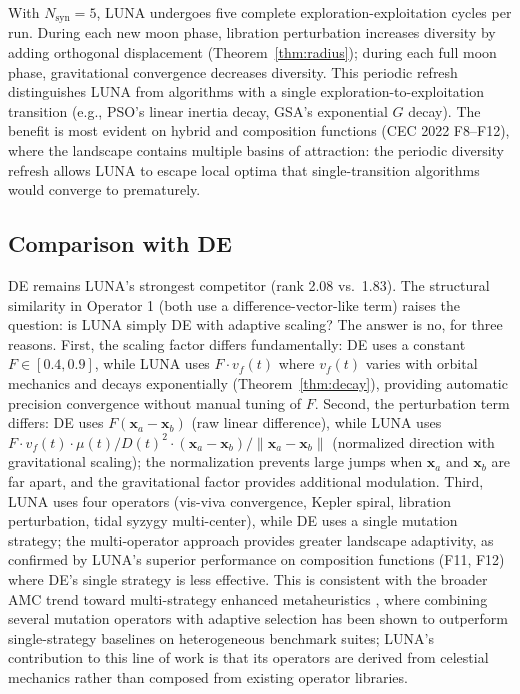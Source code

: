 \documentclass[review]{elsarticle}
\theoremstyle{definition}
\begin{document}
With $N_{\mathrm{syn}} = 5$, LUNA undergoes five complete exploration-exploitation cycles per run. During each new moon phase, libration perturbation increases diversity by adding orthogonal displacement (Theorem~\ref{thm:radius}); during each full moon phase, gravitational convergence decreases diversity. This periodic refresh distinguishes LUNA from algorithms with a single exploration-to-exploitation transition (e.g., PSO's linear inertia decay, GSA's exponential $G$ decay). The benefit is most evident on hybrid and composition functions (CEC 2022 F8--F12), where the landscape contains multiple basins of attraction: the periodic diversity refresh allows LUNA to escape local optima that single-transition algorithms would converge to prematurely.

\subsection{Comparison with DE}

DE remains LUNA's strongest competitor (rank 2.08 vs.\ 1.83). The structural similarity in Operator 1 (both use a difference-vector-like term) raises the question: is LUNA simply DE with adaptive scaling? The answer is no, for three reasons. First, the scaling factor differs fundamentally: DE uses a constant $F \in [0.4, 0.9]$, while LUNA uses $F \cdot v_f(t)$ where $v_f(t)$ varies with orbital mechanics and decays exponentially (Theorem~\ref{thm:decay}), providing automatic precision convergence without manual tuning of $F$. Second, the perturbation term differs: DE uses $F(\mathbf{x}_a - \mathbf{x}_b)$ (raw linear difference), while LUNA uses $F \cdot v_f(t) \cdot \mu(t)/D(t)^2 \cdot (\mathbf{x}_a - \mathbf{x}_b)/\|\mathbf{x}_a - \mathbf{x}_b\|$ (normalized direction with gravitational scaling); the normalization prevents large jumps when $\mathbf{x}_a$ and $\mathbf{x}_b$ are far apart, and the gravitational factor provides additional modulation. Third, LUNA uses four operators (vis-viva convergence, Kepler spiral, libration perturbation, tidal syzygy multi-center), while DE uses a single mutation strategy; the multi-operator approach provides greater landscape adaptivity, as confirmed by LUNA's superior performance on composition functions (F11, F12) where DE's single strategy is less effective. This is consistent with the broader AMC trend toward multi-strategy enhanced metaheuristics \cite{amcrec9}, where combining several mutation operators with adaptive selection has been shown to outperform single-strategy baselines on heterogeneous benchmark suites; LUNA's contribution to this line of work is that its operators are derived from celestial mechanics rather than composed from existing operator libraries.
\end{document}
